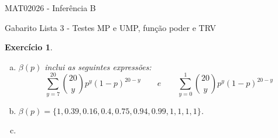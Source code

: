 \documentclass[letter,11pt]{article}
\newtheorem{exer}{Exercício}
\begin{document}
\begin{center}{ \Large MAT02026 - Inferência B }\end{center}

\begin{center}
{\large  \sc Gabarito Lista 3 - Testes MP e UMP, função poder e TRV}
\end{center}
\vspace{5mm}

\begin{exer} \rm
\begin{enumerate}[a)]
\item $\beta(p)$ inclui as seguintes expressões:
$$
\sum_{y=7}^{20}  {20 \choose y}p^y(1-p)^{20-y} \qquad e \qquad \sum_{y=0}^1  {20 \choose y}p^y(1-p)^{20-y}
$$


\item $\beta(p) = \{1, 0.39, 0.16, 0.4, 0.75, 0.94, 0.99, 1, 1, 1, 1\}$. 

\item

\end{enumerate}
\end{exer}
\end{document}
